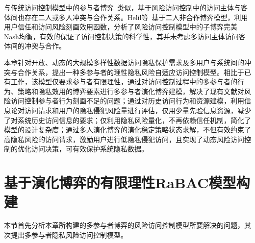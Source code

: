 与传统访问控制模型中的参与者博弈~\cite{gao2018game,hu2014game,liu2016dynamic}类似，基于风险访问控制中的访问主体与客体间也存在二人或多人冲突与合作关系。Helil等~\cite{helil2017non}基于二人非合作博弈模型，利用用户信任和访问风险刻画效用函数，分析了风险访问控制模型中的子博弈完美Nash均衡，有效的保证了访问控制决策的科学性，其并未考虑多访问主体访问客体间的冲突与合作。

本章针对开放、动态的大规模多样性数据访问隐私保护需求及多用户与系统间的冲突与合作关系，提出一种多参与者的理性隐私风险自适应访问控制模型。相比于已有工作，该模型仅要求参与者有限理性，通过对访问控制过程中的多参与者的行为、策略和隐私效用的博弈要素进行多参与者演化博弈建模，解决了现有文献对风险访问控制参与者行为刻画不足的问题；通过对历史访问行为和资源建模，利用信息论对访问请求和用户的隐私侵犯风险量进行评估，仅用少量先验信息资源，减少了对系统历史访问信息的要求；仅利用隐私风险量化，不再依赖信任机制，简化了模型的设计复杂度；通过多人演化博弈的演化稳定策略状态求解，不但有效约束了高隐私风险的访问请求，激励用户进行低隐私侵犯访问，且实现了动态风险访问控制的优化访问决策，可有效保护系统隐私数据。

\section{基于演化博弈的有限理性RaBAC模型构建}
本节首先分析本章所构建的多参与者博弈的风险访问控制模型所要解决的问题，其次提出多参与者隐私风险访问控制模型。


